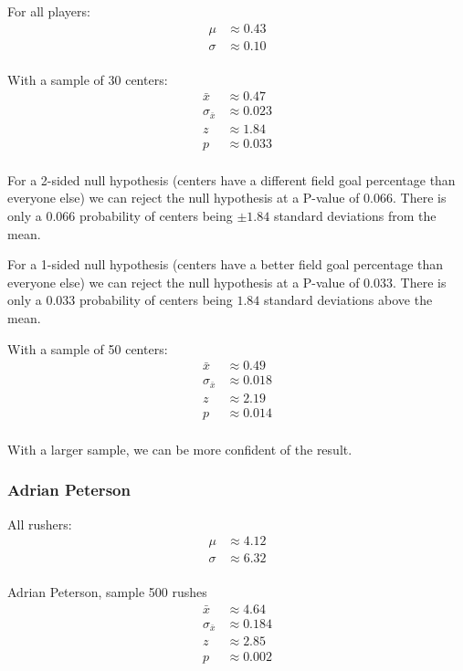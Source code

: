 \documentclass[letterpaper, landscape]{exam}
\begin{document}
  For all players:
  \begin{align*}
    \mu    & \approx 0.43 \\
    \sigma & \approx 0.10 \\
  \end{align*}

  With a sample of 30 centers:
  \begin{align*}
    \bar{x}          & \approx 0.47 \\
    \sigma_{\bar{x}} & \approx 0.023 \\
    z                & \approx 1.84 \\
    p                & \approx 0.033 \\
  \end{align*}

  For a 2-sided null hypothesis (centers have a different field goal percentage
  than everyone else) we can reject the null hypothesis at a P-value of 0.066.
  There is only a 0.066 probability of centers being $\pm 1.84$ standard
  deviations from the
  mean.

  For a 1-sided null hypothesis (centers have a better field goal percentage
  than everyone else) we can reject the null hypothesis at a P-value of 0.033.
  There is only a 0.033 probability of centers being $1.84$ standard deviations
  above the mean.

  With a sample of 50 centers:
  \begin{align*}
    \bar{x}          & \approx 0.49 \\
    \sigma_{\bar{x}} & \approx 0.018 \\
    z                & \approx 2.19 \\
    p                & \approx 0.014 \\
  \end{align*}

  With a larger sample, we can be more confident of the result.

  \subsubsection{Adrian Peterson}
  All rushers:
  \begin{align*}
    \mu    & \approx 4.12 \\
    \sigma & \approx 6.32 \\
  \end{align*}

  Adrian Peterson, sample 500 rushes
  \begin{align*}
    \bar{x}          & \approx 4.64 \\
    \sigma_{\bar{x}} & \approx 0.184 \\
    z                & \approx 2.85 \\
    p                & \approx 0.002 \\
  \end{align*}
\end{document}

